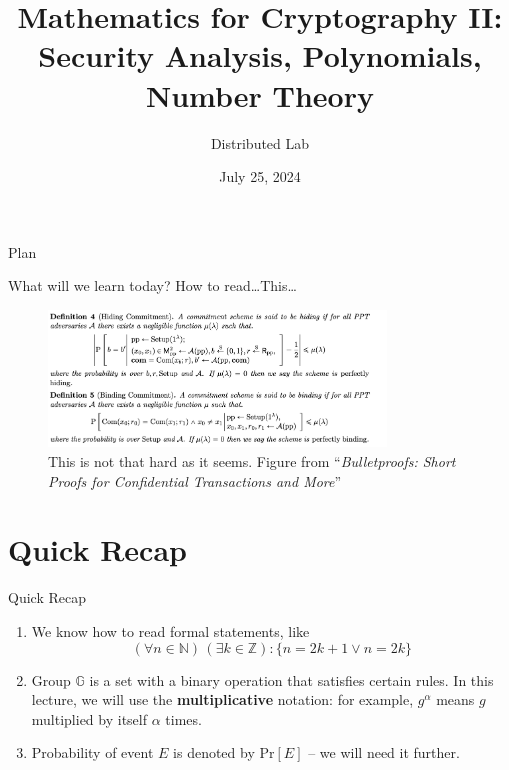 \documentclass{beamer}
\title[Mathematics II]{\textbf{Mathematics for Cryptography II: Security Analysis, Polynomials, Number Theory}}
\author{Distributed Lab}
\date{July 25, 2024}
\begin{document}
    \frame {
      \titlepage
    }
  
    \begin{frame}{Plan}
      \tableofcontents
    \end{frame}

    \begin{frame}{What will we learn today?}
        How to read\ldots This\ldots

        \begin{figure}
            \includegraphics[width=0.8\textwidth]{images/lecture_2/bulletproof.png}
            \caption{This is not that hard as it seems. Figure from ``\textit{Bulletproofs: Short Proofs for Confidential Transactions and More}''}
            \label{fig:wuuttt}
        \end{figure}
    \end{frame}

    \section{Quick Recap}

    \begin{frame}{Quick Recap}
        \begin{enumerate}
            \item We know how to read formal statements, like 
            \begin{equation*}
                (\forall n \in \mathbb{N}) \, (\exists k \in \mathbb{Z}): \{n=2k+1 \vee n = 2k\}
            \end{equation*}
            \item Group $\mathbb{G}$ is a set with a binary operation that satisfies certain rules. In this lecture, we will use the \textbf{multiplicative} notation: for example, $g^{\alpha}$ means $g$ multiplied by itself $\alpha$ times.
            \item Probability of event $E$ is denoted by $\text{Pr}[E]$ -- we will need it further.
        \end{enumerate}
    \end{frame}
\end{document}
